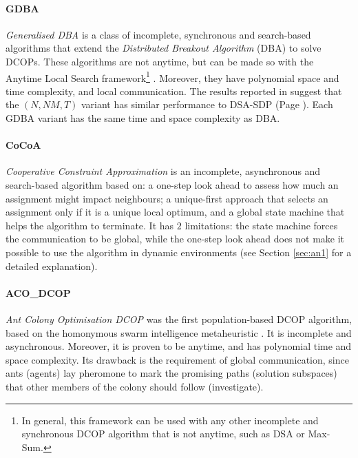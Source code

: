 \paragraph{GDBA}

\emph{Generalised DBA} \cite{okamoto2016} is a class of incomplete, synchronous and
search-based algorithms that extend the \emph{Distributed Breakout Algorithm} (DBA)
\cite{yokoo1996} to solve DCOPs. These algorithms are not anytime, but can be made so
with the Anytime Local Search framework\footnote{In general, this framework can be
used with any other incomplete and synchronous DCOP algorithm that is not anytime, such as
DSA or Max-Sum.} \cite{zivan2014}. Moreover, they have polynomial space and time
complexity, and local communication. The results reported in \cite{mahmud2020b,zivan2014}
suggest that the $(N, NM, T)$ variant has similar performance to DSA-SDP (Page
\pageref{sec:dsa}). Each GDBA variant has the same time and space complexity as DBA.
\clearpage

\paragraph{CoCoA}

\emph{Cooperative Constraint Approximation} \cite{van2017}
is an incomplete, asynchronous and search-based algorithm based on: a one-step look ahead
to assess how much an assignment might impact neighbours; a unique-first approach that
selects an assignment only if it is a unique local optimum, and a global state machine
that helps the algorithm to terminate. It has $2$ limitations: the state machine forces
the communication to be global, while the one-step look ahead does not make it possible
to use the algorithm in dynamic environments (see Section \ref{sec:an1} for a detailed
explanation).

\paragraph{ACO\_DCOP}

\emph{Ant Colony Optimisation DCOP} \cite{chen2018acodcop} was the first population-based
DCOP algorithm, based on the homonymous swarm intelligence metaheuristic
\cite{dorigo2006ant}. It is incomplete and asynchronous. Moreover, it is proven to be
anytime, and has polynomial time and space complexity. Its drawback is the requirement of
global communication, since ants (agents) lay pheromone to mark the promising paths
(solution subspaces) that other members of the colony should follow (investigate).

